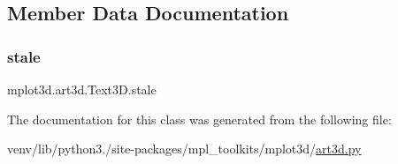 \subsection{Member Data Documentation}
\mbox{\label{classmplot3d_1_1art3d_1_1Text3D_a8ba93465d7b4ccba7fbda621e9a0adaf}} 
\subsubsection{\texorpdfstring{stale}{stale}}
{\footnotesize\ttfamily mplot3d.\+art3d.\+Text3\+D.\+stale}



The documentation for this class was generated from the following file\+:\begin{DoxyCompactItemize}
\item 
venv/lib/python3./site-\/packages/mpl\+\_\+toolkits/mplot3d/\hyperlink{art3d_8py}{art3d.\+py}\end{DoxyCompactItemize}
